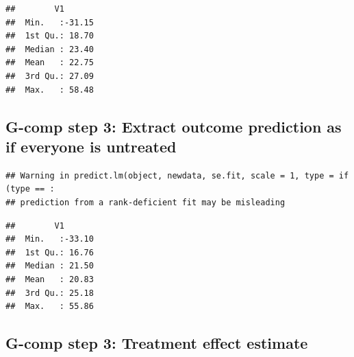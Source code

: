 \documentclass[
]{book}
\newenvironment{Shaded}{\begin{snugshade}}{\end{snugshade}}
\newcommand{\AttributeTok}[1]{\textcolor[rgb]{0.77,0.63,0.00}{#1}}
\newcommand{\DecValTok}[1]{\textcolor[rgb]{0.00,0.00,0.81}{#1}}
\newcommand{\FunctionTok}[1]{\textcolor[rgb]{0.00,0.00,0.00}{#1}}
\newcommand{\NormalTok}[1]{#1}
\newcommand{\OtherTok}[1]{\textcolor[rgb]{0.56,0.35,0.01}{#1}}
\newcommand{\SpecialCharTok}[1]{\textcolor[rgb]{0.00,0.00,0.00}{#1}}
\newcommand{\StringTok}[1]{\textcolor[rgb]{0.31,0.60,0.02}{#1}}
\begin{document}
\begin{verbatim}
##        V1        
##  Min.   :-31.15  
##  1st Qu.: 18.70  
##  Median : 23.40  
##  Mean   : 22.75  
##  3rd Qu.: 27.09  
##  Max.   : 58.48
\end{verbatim}

\hypertarget{g-comp-step-3-extract-outcome-prediction-as-if-everyone-is-untreated-2}{%
\subsection{G-comp step 3: Extract outcome prediction as if everyone is untreated}\label{g-comp-step-3-extract-outcome-prediction-as-if-everyone-is-untreated-2}}

\begin{Shaded}
\end{Shaded}

\begin{verbatim}
## Warning in predict.lm(object, newdata, se.fit, scale = 1, type = if (type == :
## prediction from a rank-deficient fit may be misleading
\end{verbatim}

\begin{Shaded}
\end{Shaded}

\begin{verbatim}
##        V1        
##  Min.   :-33.10  
##  1st Qu.: 16.76  
##  Median : 21.50  
##  Mean   : 20.83  
##  3rd Qu.: 25.18  
##  Max.   : 55.86
\end{verbatim}

\hypertarget{g-comp-step-3-treatment-effect-estimate-1}{%
\subsection{G-comp step 3: Treatment effect estimate}\label{g-comp-step-3-treatment-effect-estimate-1}}
\end{document}
